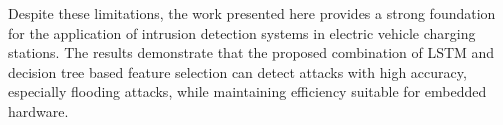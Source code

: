 Despite these limitations, the work presented here provides a strong foundation for the application of intrusion detection systems in electric vehicle charging stations. The results demonstrate that the proposed combination of LSTM and decision tree based feature selection can detect attacks with high accuracy, especially flooding attacks, while maintaining efficiency suitable for embedded hardware.

